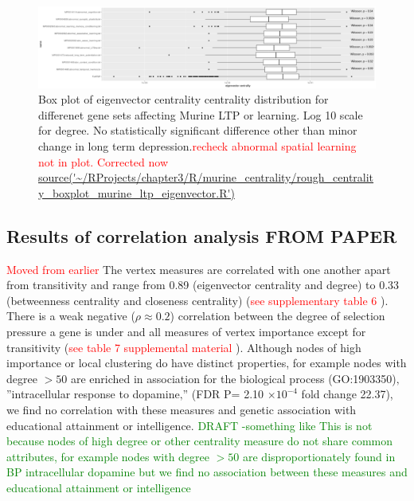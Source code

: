 \begin{figure}
    \centering
    \includegraphics[width=\textwidth]{images/chapter3/ggplot2/murine_centrality_boxplot/with_p/Rplot_eigenvector_centrality.png}
    \caption{Box plot of eigenvector centrality centrality distribution for differenet gene sets affecting Murine LTP or learning. Log 10 scale for degree. No statistically significant difference other than minor change in long term depression.\textcolor{red}{recheck abnormal spatial learning not in plot. Corrected now} \url{source('~/RProjects/chapter3/R/murine_centrality/rough_centrality_boxplot_murine_ltp_eigenvector.R')}}
    \label{fig:murine_ltp_centrality_boxplot_eigenvector}
\end{figure}



\subsection{Results of correlation analysis FROM PAPER}
\textcolor{red}{Moved from earlier}
The vertex measures are correlated with one another apart from transitivity and range from 0.89 (eigenvector centrality and degree) to 0.33 (betweenness centrality and closeness centrality) (\textcolor{red}{see supplementary table 6} ).
There is a weak negative ($\rho \approx 0.2$) correlation between 
the degree of selection pressure a gene is under and all measures of vertex importance except for transitivity (\textcolor{red}{see table 7 supplemental material} ).
Although nodes of high importance or local clustering do have distinct properties, for example nodes with degree $> 50$ are enriched in association for the biological process (GO:1903350)‚ ”intracellular response to dopamine‚” (FDR P= 2.10 $\times 10^{-4}$ fold change 22.37), we find no correlation with these measures and genetic association with educational attainment or intelligence. 
\textcolor{green}{DRAFT -something like This is not because nodes of high degree or other centrality measure do not share common attributes, for example nodes with degree $>50$ are disproportionately found in BP intracellular dopamine but we find no association between these measures and educational attainment or intelligence}

